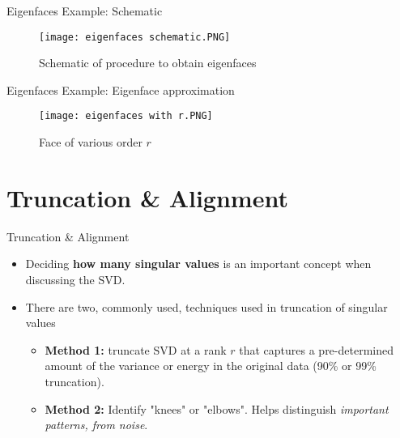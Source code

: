 \documentclass[9pt]{beamer}
\begin{document}
\begin{frame}{Eigenfaces Example: Schematic}
        \begin{figure}
        \texttt{[image: eigenfaces schematic.PNG]}
        \caption{Schematic of procedure to obtain eigenfaces}
    \end{figure}
\end{frame}

\begin{frame}{Eigenfaces Example: Eigenface approximation}
    \begin{figure}
        \texttt{[image: eigenfaces with r.PNG]}
        \caption{Face of various order $r$}
    \end{figure}
\end{frame}

\section{Truncation \& Alignment}

\begin{frame}{Truncation \& Alignment}
    \begin{itemize}
        \item Deciding \textbf{how many singular values} is an important concept when discussing the SVD. 
        \item There are two, commonly used, techniques used in truncation of singular values
        \begin{itemize}
            \item \textbf{Method 1:} truncate SVD at a rank $r$ that captures a pre-determined amount of the variance or energy in the original data (90\% or 99\% truncation).
            \item \textbf{Method 2:} Identify "knees" or "elbows". Helps distinguish \textit{important patterns, from noise}. 
        \end{itemize}
    \end{itemize}
\end{frame}
\end{document}
